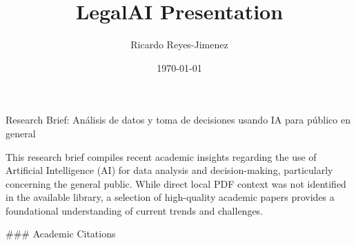 \documentclass[aspectratio=169]{beamer}
\title[LegalAI Presentation]{LegalAI Presentation}
\subtitle{}
\author{Ricardo Reyes-Jimenez}
\institute{Universidad de La Sabana}
\date{\today}
\begin{document}
\begin{frame}
  \titlepage
\end{frame}

\usebackgroundtemplate{}



\begin{frame}[fragile]{Research Brief: Análisis de datos y toma de decisiones usando IA para público en general}

This research brief compiles recent academic insights regarding the use of Artificial Intelligence (AI) for data analysis and decision-making, particularly concerning the general public. While direct local PDF context was not identified in the available library, a selection of high-quality academic papers provides a foundational understanding of current trends and challenges.

### Academic Citations


\end{frame}
\end{document}
